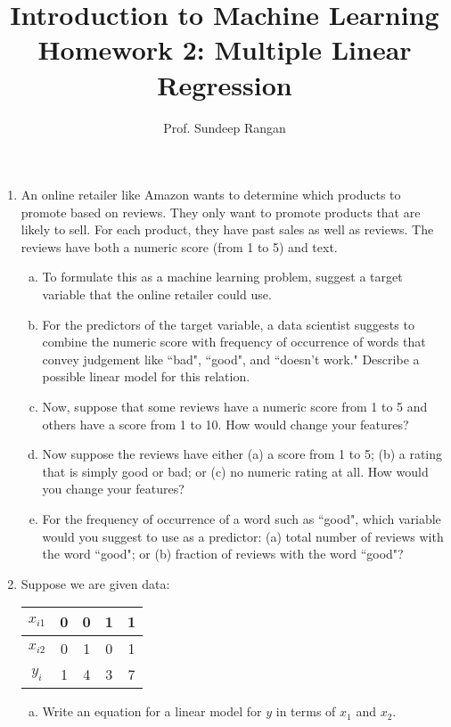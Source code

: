 \documentclass[11pt]{article}
\begin{document}
\title{Introduction to Machine Learning\\
Homework 2:  Multiple Linear Regression}
\author{Prof. Sundeep Rangan}
\date{}

\maketitle

\begin{enumerate}

\item An online retailer like Amazon wants to determine which products
 to promote based on reviews.  They only want to promote products that are likely
 to sell. For each product, they have past sales as well as
 reviews.  The reviews have both a numeric score (from 1 to 5) and text.
\begin{enumerate}[(a)]
\item To formulate this as a machine learning problem, suggest
a target variable that the online retailer could use.

\item For the predictors of the target variable, a data scientist
suggests to combine the numeric score with frequency of occurrence
of words that convey judgement like ``bad", ``good", and ``doesn't work."
Describe a possible linear model for this relation.

\item Now, suppose that
some reviews have a numeric score from 1 to 5 and others have a score
from 1 to 10.  How would change your features?

\item Now suppose the reviews have either (a) a score from 1 to 5;
(b) a rating that is simply good or bad; or (c) no numeric rating at all.
How would you change your features?

\item For the frequency of occurrence of a word such as ``good",
which variable would you suggest to use as a predictor:
(a) total number of reviews with the word ``good";
or (b) fraction of reviews with the word ``good"?
\end{enumerate}

\item Suppose we are given data:
\begin{center}
\begin{tabular}[h]{|c|c|c|c|c|} \hline
$x_{i1}$ & 0 & 0 & 1 & 1 \\ \hline
$x_{i2}$ & 0 & 1 & 0 & 1 \\ \hline
$y_i$ &    1 & 4 & 3 & 7  \\ \hline
\end{tabular}
\begin{enumerate}[(a)]
\item Write an equation for a linear model for $y$ in terms of $x_1$ and $x_2$.


\end{enumerate}
\end{center}
\end{enumerate}
\end{document}
